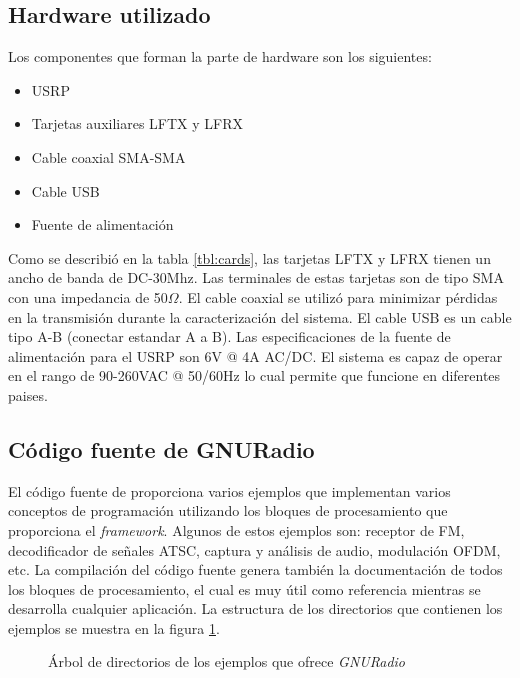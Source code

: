 \subsection{Hardware utilizado}
Los componentes que forman la parte de hardware son los siguientes:

\begin{itemize}
  \item USRP
  \item Tarjetas auxiliares LFTX y LFRX
  \item Cable coaxial SMA-SMA
  \item Cable USB
  \item Fuente de alimentaci\'on
\end{itemize} 

Como se describi\'o en la tabla \ref{tbl:cards}, las tarjetas LFTX y LFRX tienen un ancho de banda
de DC-30Mhz. Las terminales de estas tarjetas son de tipo SMA con una impedancia de 50$\Omega$. El
cable coaxial se utiliz\'o para minimizar p\'erdidas en la transmisi\'on durante la caracterizaci\'on
del sistema. El cable USB es un cable tipo A-B (conectar estandar A a B). Las especificaciones de la
fuente de alimentaci\'on para el USRP son 6V @ 4A AC/DC. El sistema es capaz de operar en el rango
de 90-260VAC @ 50/60Hz lo cual permite que funcione en diferentes paises.


\subsection{C\'odigo fuente de GNURadio}
El c\'odigo fuente de \gnuradio proporciona varios ejemplos que implementan varios conceptos de programaci\'on
utilizando los bloques de procesamiento que proporciona el \emph{framework}. Algunos de estos
ejemplos son: receptor de FM, decodificador de se\~nales ATSC, captura y an\'alisis de audio,
modulaci\'on OFDM, etc. La compilaci\'on del c\'odigo fuente genera tambi\'en la documentaci\'on de todos
los bloques de procesamiento, el cual es muy \'util como referencia mientras se desarrolla cualquier
aplicaci\'on. La estructura de los directorios que contienen los ejemplos se muestra en la figura
\ref{fig:extree}.

\begin{figure}[ht]
\DTsetlength{1.5em}{1em}{0.2em}{0.4pt}{1.6pt} %
	\vspace{0.5in}
	\caption{\'Arbol de directorios de los ejemplos que ofrece \emph{GNURadio}}
	\label{fig:extree}
\end{figure}

